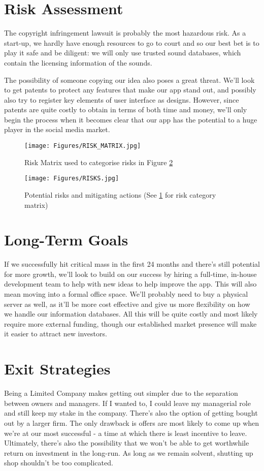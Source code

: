 \documentclass[12pt]{article}
\begin{document}
\section{Risk Assessment}

The copyright infringement lawsuit is probably the most hazardous risk. As a start-up, we hardly have enough resources to go to court and so our best bet is to play it safe and be diligent: we will only use trusted sound databases, which contain the licensing information of the sounds. 
 
The possibility of someone copying our idea also poses a great threat. We’ll look to get patents to protect any features that make our app stand out, and possibly also try to register key elements of user interface as designs. However, since patents are quite costly to obtain in terms of both time and money, we’ll only begin the process when it becomes clear that our app has the potential to a huge player in the social media market. 

\begin{figure}[!hb]
    \centering
    \texttt{[image: Figures/RISK\_MATRIX.jpg]}
    \caption{
    Risk Matrix used to categorise risks in Figure \ref{fig:risks}}
    \label{fig:riskMatrix}
\end{figure}

\begin{figure}
    \centering
    \texttt{[image: Figures/RISKS.jpg]}
    \caption{Potential risks and mitigating actions (See \ref{fig:riskMatrix} for risk category matrix)}
    \label{fig:risks}
\end{figure}

\section{Long-Term Goals}
If we successfully hit critical mass in the first 24 months and there’s still potential for more growth, we’ll look to build on our success by hiring a full-time, in-house development team to help with new ideas to help improve the app. This will also mean moving into a formal office space. We’ll probably need to buy a physical server as well, as it’ll be more cost effective and give us more flexibility on how we handle our information databases. All this will be quite costly and most likely require more external funding, though our established market presence will make it easier to attract new investors.

\section{Exit Strategies}
Being a Limited Company makes getting out simpler due to the separation between owners and managers. If I wanted to, I could leave my managerial role and still keep my stake in the company.
There’s also the option of getting bought out by a larger firm. The only drawback is offers are most likely to come up when we're at our most successful - a time at which there is least incentive to leave. Ultimately, there’s also the possibility that we won’t be able to get worthwhile return on investment in the long-run. As long as we remain solvent, shutting up shop shouldn't be too complicated.

\newpage


\end{document}

